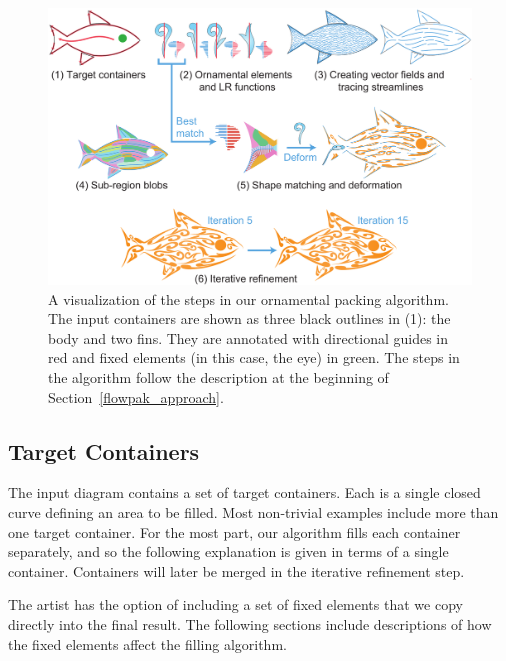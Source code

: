\begin{figure}
\centering
\includegraphics[width=1.0\textwidth]{figures/flowpak/pipeline.pdf} 
\caption[FLOWPAK pipeline]
{\label{fig_flowpak_pipeline} 
A visualization of the steps in our ornamental packing algorithm.
The input containers are shown as three black outlines in (1): the body
and two fins.  They are annotated with directional guides in red and fixed elements (in this 
case, the eye) in green.  The steps in the algorithm follow the
description at the beginning of Section~\ref{flowpak_approach}.
}
\end{figure}

\subsection{Target Containers}
\label{flowpak_target_containers}

The input diagram contains a set of target containers. Each is a single
closed curve defining an area
to be filled.  Most non-trivial examples include more than one target
container.  For the most part, our algorithm fills each container separately,
and so the following explanation is given in terms of a single container.
Containers will later be merged in the iterative refinement step.

The artist has the option of including a set of fixed elements that
we copy directly into the final result. The following sections
include descriptions of how the fixed elements affect the filling
algorithm.

